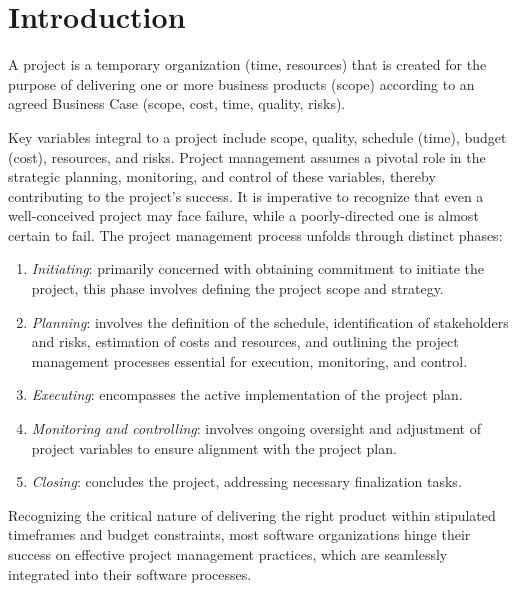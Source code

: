 \section{Introduction}

\begin{definition}
    A project is a temporary organization (time, resources) that is created for the purpose of delivering one or more business products (scope) according to an agreed Business Case (scope, cost, time, quality, risks).
\end{definition}
Key variables integral to a project include scope, quality, schedule (time), budget (cost), resources, and risks.
Project management assumes a pivotal role in the strategic planning, monitoring, and control of these variables, thereby contributing to the project's success.
It is imperative to recognize that even a well-conceived project may face failure, while a poorly-directed one is almost certain to fail.
The project management process unfolds through distinct phases:
\begin{enumerate}
    \item \textit{Initiating}: primarily concerned with obtaining commitment to initiate the project, this phase involves defining the project scope and strategy.
    \item \textit{Planning}: involves the definition of the schedule, identification of stakeholders and risks, estimation of costs and resources, and outlining the project management processes essential for execution, monitoring, and control.
    \item \textit{Executing}: encompasses the active implementation of the project plan.
    \item \textit{Monitoring and controlling}: involves ongoing oversight and adjustment of project variables to ensure alignment with the project plan.
    \item \textit{Closing}: concludes the project, addressing necessary finalization tasks.
\end{enumerate}
Recognizing the critical nature of delivering the right product within stipulated timeframes and budget constraints, most software organizations hinge their success on effective project management practices, which are seamlessly integrated into their software processes.